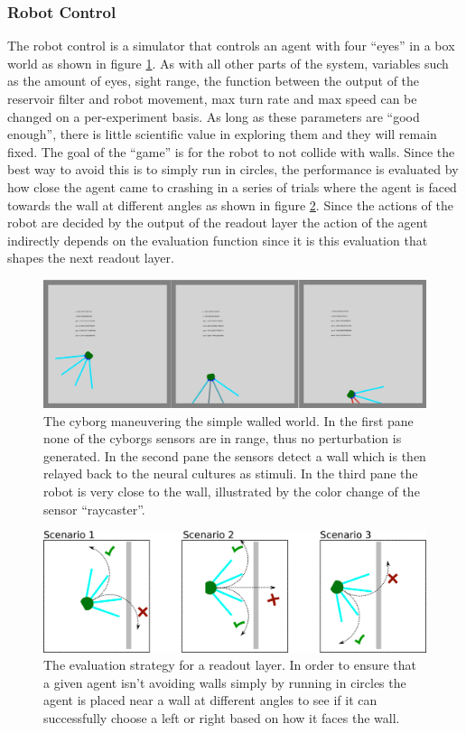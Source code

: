 \subsubsection{Robot Control}
The robot control is a simulator that controls an agent with four ``eyes'' in a box
world as shown in figure \ref{figGame}.
As with all other parts of the system, variables such as the amount of eyes, sight
range, the function between the output of the reservoir filter and robot
movement, max turn rate and max speed can be changed on a per-experiment basis.
As long as these parameters are ``good enough'', there is little scientific
value in exploring them and they will remain fixed.
The goal of the ``game'' is for the robot to not collide with walls.
Since the best way to avoid this is to simply run in circles, the performance is
evaluated by how close the agent came to crashing in a series of trials where
the agent is faced towards the wall at different angles as shown in figure \ref{challenges}.
Since the actions of the robot are decided by the output of the readout layer
the action of the agent indirectly depends on the evaluation function since it
is this evaluation that shapes the next readout layer.
\begin{figure}[h!]
  \centering
  \includegraphics[width=1\textwidth]{fig/TAC/game2.png}
  \caption{
    The cyborg maneuvering the simple walled world. In the first pane none of
    the cyborgs sensors are in range, thus no perturbation is generated.
    In the second pane the sensors detect a wall which is then relayed back to
    the neural cultures as stimuli.
    In the third pane the robot is very close to the wall, illustrated by the
    color change of the sensor ``raycaster''.
  }
  \label{figGame}
\end{figure}
\begin{figure}[h!]
  \centering
  \includegraphics[width=1\textwidth]{fig/challenges.png}
  \caption{
    The evaluation strategy for a readout layer.
    In order to ensure that a given agent isn't avoiding walls simply by running
    in circles the agent is placed near a wall at different angles to see if it
    can successfully choose a left or right based on how it faces the wall.
  }
  \label{challenges}
\end{figure}

